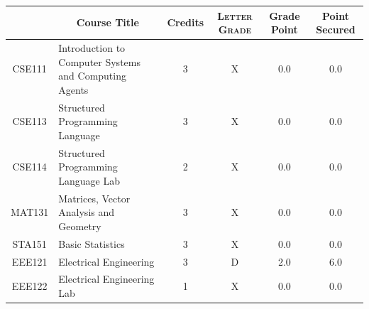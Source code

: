 \documentclass[11pt]{article}
\newcommand*{\numtwo}[1]{\pgfmathprintnumber[
                    fixed, precision=2, fixed zerofill=true]{#1}}
\begin{document}
                \begin{center}
                    \renewcommand{\arraystretch}{1.08}
                    
                \begin{tabular}{|c|l|c|>{\scshape}c|c|c|}
                \hline  \rule[-1ex]{0pt}{3.5ex} {\centering{\bf Course Code}} &  \multicolumn{1}{c|}{\textbf{Course Title}}  & {\bf Credits} & {\bf Letter Grade} & {\bf Grade Point} & {\bf Point Secured}  \\ 
                \hline   CSE111 &  Introduction to Computer Systems and Computing Agents		 & 3 & X & 0.0 & 0.0 \\ %
                \hline   CSE113 &  Structured Programming Language		 & 3 & X & 0.0 & 0.0 \\ %
                \hline   CSE114 &  Structured Programming Language Lab		 & 2 & X & 0.0 & 0.0 \\ %
                \hline   MAT131 &  Matrices, Vector Analysis and Geometry		 & 3 & X & 0.0 & 0.0 \\ %
                \hline   STA151 &  Basic Statistics		 & 3 & X & 0.0 & 0.0 \\ %
                \hline   EEE121 &  Electrical Engineering		 & 3 & D & 2.0 & 6.0 \\ %
                \hline   EEE122 &  Electrical Engineering Lab		 & 1 & X & 0.0 & 0.0 \\ %

\hline                %
                \end{tabular}
                \end{center}
                \renewcommand{\arraystretch}{1.03}
\end{document}
